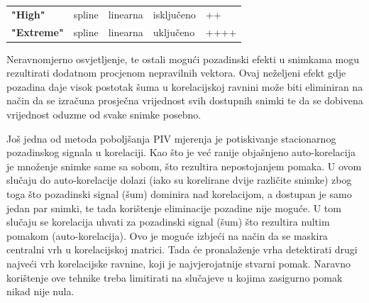 \begin{description}[style=unboxed,leftmargin=0cm]
\begin{table}[h]
\begin{tabular}{|l|llll|}
			\textbf{"High"}                                                                                  & spline                                                                                                    & linearna                                                                                   & isključeno                                                                                       & ++                                                                                           \\
			\textbf{"Extreme"}                                                                               & spline                                                                                                    & linearna                                                                                   & uključeno                                                                                        & ++++                                                                                         \\ \hline
		\end{tabular}
	\label{tab:5.1}
	\end{table}
	\item[Eliminacija pozadine] Neravnomjerno osvjetljenje, te ostali mogući pozadinski efekti u snimkama mogu rezultirati dodatnom procjenom nepravilnih vektora. Ovaj neželjeni efekt gdje pozadina daje visok postotak šuma u korelacijskoj ravnini može biti eliminiran na način da se izračuna prosječna vrijednost svih dostupnih snimki te da se dobivena vrijednost oduzme od svake snimke posebno.
	\item[Potiskivanje auto-korelacije] Još jedna od metoda poboljšanja PIV mjerenja je potiskivanje stacionarnog pozadinskog signala u korelaciji. Kao što je već ranije objašnjeno auto-korelacija je množenje snimke same sa sobom, što rezultira nepostojanjem pomaka. U ovom slučaju do auto-korelacije dolazi (iako su korelirane dvije različite snimke) zbog toga što pozadinski signal (šum) dominira nad korelacijom, a dostupan je samo jedan par snimki, te tada korištenje eliminacije pozadine nije moguće. U tom slučaju se korelacija uhvati za pozadinski signal (šum) što rezultira nultim pomakom (auto-korelacija). Ovo je moguće izbjeći na način da se maskira centralni vrh u korelacijskoj matrici. Tada će pronalaženje vrha detektirati drugi najveći vrh korelacijske ravnine, koji je najvjerojatnije stvarni pomak. Naravno korištenje ove tehnike treba limitirati na slučajeve u kojima zasigurno pomak nikad nije nula.
\end{description}